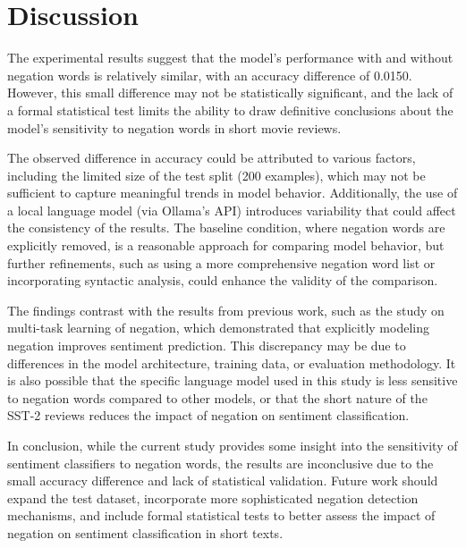 \documentclass{article}
\begin{document}
\section*{Discussion}

The experimental results suggest that the model's performance with and without negation words is relatively similar, with an accuracy difference of 0.0150. However, this small difference may not be statistically significant, and the lack of a formal statistical test limits the ability to draw definitive conclusions about the model's sensitivity to negation words in short movie reviews. 

The observed difference in accuracy could be attributed to various factors, including the limited size of the test split (200 examples), which may not be sufficient to capture meaningful trends in model behavior. Additionally, the use of a local language model (via Ollama's API) introduces variability that could affect the consistency of the results. The baseline condition, where negation words are explicitly removed, is a reasonable approach for comparing model behavior, but further refinements, such as using a more comprehensive negation word list or incorporating syntactic analysis, could enhance the validity of the comparison.

The findings contrast with the results from previous work, such as the study on multi-task learning of negation, which demonstrated that explicitly modeling negation improves sentiment prediction. This discrepancy may be due to differences in the model architecture, training data, or evaluation methodology. It is also possible that the specific language model used in this study is less sensitive to negation words compared to other models, or that the short nature of the SST-2 reviews reduces the impact of negation on sentiment classification.

In conclusion, while the current study provides some insight into the sensitivity of sentiment classifiers to negation words, the results are inconclusive due to the small accuracy difference and lack of statistical validation. Future work should expand the test dataset, incorporate more sophisticated negation detection mechanisms, and include formal statistical tests to better assess the impact of negation on sentiment classification in short texts.
\end{document}

